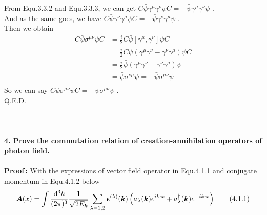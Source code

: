\documentclass[12pt]{article}
\begin{document}
\begin{spacing}{1.5}
From Equ.3.3.2 and Equ.3.3.3, we can get $C \bar\psi\gamma^{\mu}\gamma^{\nu}\psi C = -\bar\psi \gamma^{\mu}\gamma^{\nu} \psi$ . \\
And as the same goes, we have $C \bar\psi\gamma^{\nu}\gamma^{\mu}\psi C = -\bar\psi \gamma^{\nu}\gamma^{\mu} \psi$ . \\
Then we obtain
\begin{equation}
\begin{aligned}
C\bar\psi\sigma^{\mu\nu}\psi C &= \frac{i}{2}C\bar\psi[\gamma^{\mu},\gamma^{\nu}]\psi C\\
&= \frac{i}{2}C\bar\psi(\gamma^{\mu}\gamma^{\nu}-\gamma^{\nu}\gamma^{\mu})\psi C\\
&= \frac{i}{2}\bar\psi(\gamma^{\mu}\gamma^{\nu}-\gamma^{\nu}\gamma^{\mu})\psi \\
&= \bar\psi\sigma^{\nu\mu}\psi =-\bar\psi\sigma^{\mu\nu}\psi \\
\end{aligned}
	\tag{3.3.3}
\end{equation}
So we can say $\displaystyle C\bar\psi\sigma^{\mu\nu}\psi C = -\bar\psi\sigma^{\mu\nu}\psi$ .\\
Q.E.D.\\
~\\
~\\
~\\

\textbf{4. Prove the commutation relation of creation-annihilation operators of photon field.} \\		%
~\\
\textbf{Proof\,:} With the expressions of vector field operator in Equ.4.1.1 and conjugate momentum in Equ.4.1.2 below
\begin{equation}
\bm{A}(x) = \int \frac{\mathop{}\!\mathrm{d}^{3}k}{(2\pi)^{3}} \frac{1}{\sqrt{2E_{\bm k}}} \sum\limits_{\lambda=1,2} \bm\epsilon^{(\lambda)}(\bm k) \left( a_{\lambda}(\bm k)e^{ik \cdot x}+a_{\lambda}^{\dagger}(\bm k)e^{-ik \cdot x} \right) 
	\tag{4.1.1}
\end{equation}


\end{spacing}
\end{document}
